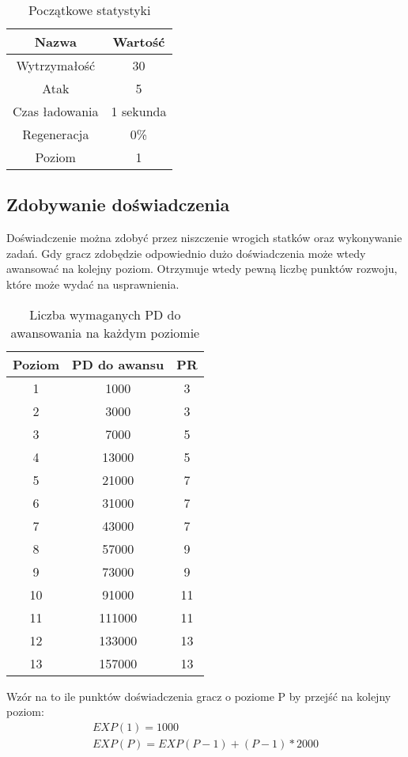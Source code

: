 \begin{table}[h]
\centering
\begin{tabular}{ | c | c | }
\hline
\textbf{Nazwa} & \textbf{Wartość} \\ \hline
Wytrzymałość & 30 \\ \hline
Atak & 5 \\ \hline
Czas ładowania & 1 sekunda \\ \hline
Regeneracja & 0\% \\ \hline
Poziom & 1 \\ \hline
\end{tabular}
\caption{Początkowe statystyki}
\end{table}

\subsection{Zdobywanie doświadczenia}
Doświadczenie można zdobyć przez niszczenie wrogich statków oraz wykonywanie zadań. Gdy gracz zdobędzie odpowiednio dużo doświadczenia może wtedy awansować na kolejny poziom. Otrzymuje wtedy pewną liczbę punktów rozwoju, które może wydać na usprawnienia.

\begin{table}[h]
\centering
\begin{tabular}{ | c | c | c | }
\hline
\textbf{Poziom} & \textbf{PD do awansu} & \textbf{PR} \\
\hline
1 & 1000 & 3 \\
2 & 3000 & 3 \\
3 & 7000 & 5 \\
4 & 13000 & 5 \\
5 & 21000 & 7 \\
6 & 31000 & 7 \\
7 & 43000 & 7 \\
8 & 57000 & 9 \\
9 & 73000 & 9 \\
10 & 91000 & 11 \\
11 & 111000 & 11 \\
12 & 133000 & 13 \\
13 & 157000 & 13 \\
\hline

\end{tabular}
\caption{Liczba wymaganych PD do awansowania na każdym poziomie}
\end{table}

Wzór na to ile punktów doświadczenia gracz o poziome P by przejść na kolejny poziom:
\begin{align*}
EXP(1) = 1000 \\
EXP(P) = EXP(P-1) + (P-1)*2000 
\end{align*}

